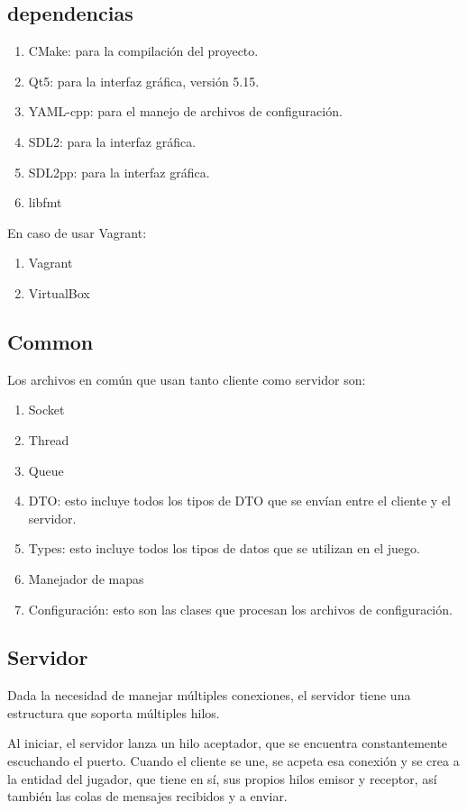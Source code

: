 \documentclass[titlepage,a4paper]{article}
\begin{document}
\subsection{dependencias}
\begin{enumerate}
  \item CMake: para la compilación del proyecto.
  \item Qt5: para la interfaz gráfica, versión 5.15.
  \item YAML-cpp: para el manejo de archivos de configuración.
  \item SDL2: para la interfaz gráfica.
  \item SDL2pp: para la interfaz gráfica.
  \item libfmt
\end{enumerate}

En caso de usar Vagrant:
\begin{enumerate}
  \item Vagrant
  \item VirtualBox
\end{enumerate}


\subsection{Common}
Los archivos en común que usan tanto cliente como servidor son:

\begin{enumerate}
  \item Socket
  \item Thread
  \item Queue
  \item DTO: esto incluye todos los tipos de DTO que se envían entre el cliente y el servidor.
  \item Types: esto incluye todos los tipos de datos que se utilizan en el juego.
  \item Manejador de mapas
  \item Configuración: esto son las clases que procesan los archivos de configuración.
\end{enumerate}

\subsection{Servidor}
Dada la necesidad de manejar múltiples conexiones, el servidor tiene una estructura que soporta múltiples hilos.

Al iniciar, el servidor lanza un hilo aceptador, que se encuentra constantemente escuchando el puerto. Cuando el cliente se une, se acpeta esa conexión y se crea a la entidad del jugador, que tiene en sí, sus propios hilos emisor y receptor, así también las colas de mensajes recibidos y a enviar.
\end{document}
